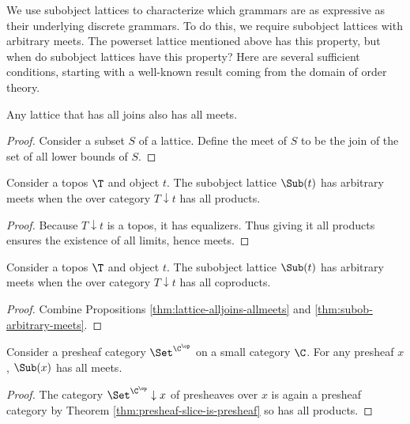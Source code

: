 We use subobject lattices to characterize which grammars are
as expressive as their underlying discrete grammars. To do
this, we require subobject lattices with arbitrary meets.  The
powerset lattice mentioned above has this property, but
when do subobject lattices have this property?  Here are
several sufficient conditions, starting with a well-known
result coming from the domain of order theory.

\begin{proposition} \label{thm:lattice-alljoins-allmeets}
  Any lattice that has all joins also has all meets.
\end{proposition}

\begin{proof}
  Consider a subset $ S $ of a lattice. Define the meet of $
  S $ to be the join of the set of all lower bounds of $ S $.
\end{proof}

\begin{proposition} \label{thm:subob-arbitrary-meets}
  Consider a topos $ \T $ and object $ t $.  The subobject
  lattice $ \Sub (t) $ has arbitrary meets when the over
  category $ T \downarrow t $ has all products.
\end{proposition}

\begin{proof}
  Because $ T \downarrow t $ is a topos, it has
  equalizers. Thus giving it all products ensures the
  existence of all limits, hence meets. 
\end{proof}

\begin{corollary}
  Consider a topos $ \T $ and object $ t $.  The subobject
  lattice $ \Sub (t) $ has arbitrary meets when the over
  category $ T \downarrow t $ has all coproducts.
\end{corollary}

\begin{proof}
  Combine Propositions \ref{thm:lattice-alljoins-allmeets}
  and \ref{thm:subob-arbitrary-meets}.
\end{proof}

\begin{corollary}
  Consider a presheaf category $ \Set^{ \C^{\op} } $ on a
  small category $ \C $. For any presheaf $ x $,
  $ \Sub (x) $ has all meets.
\end{corollary}

\begin{proof}
  The category $ \Set^{ \C^{\op} } \downarrow x $ of
  presheaves over $ x $ is again a presheaf category by
  Theorem \ref{thm:presheaf-slice-is-presheaf} so has all
  products.
\end{proof}

